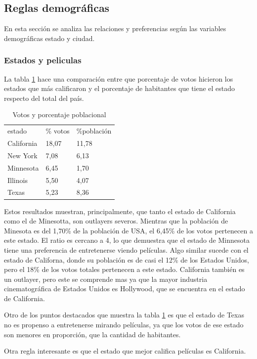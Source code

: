 \documentclass[journal]{IEEEtran}
\begin{document}
\subsection{Reglas demográficas}
En esta sección se analiza las relaciones y preferencias según las variables 
demográficas estado y ciudad. 

\subsubsection{Estados y peliculas}
La tabla \ref{table_state_population} hace una comparación entre que porcentaje
de votos hicieron los estados que más calificaron y el porcentaje de habitantes
que tiene el estado respecto del total del país.

\begin{table}[ht!]
\caption{Votos y porcentaje poblacional}
\label{table_state_population}
\centering
\begin{tabular}{l l l}
estado & \% votos & \%población  \\
California & 18,07 & 11,78 \\
New York & 7,08 & 6,13 \\
Minnesota & 6,45 & 1,70 \\
Illinois & 5,50 & 4,07 \\
Texas & 5,23 & 8,36
\end{tabular}
\end{table}

Estos resultados muestran, principalmente, que tanto el estado de California
como el de Minesotta, son outlayers severos. Mientras que la población de
Minesota es del 1,70\% de la población de USA, el 6,45\% de los votos pertenecen
a este estado. El ratio es cercano a 4, lo que demuestra
que el estado de Minnesota tiene una preferencia de entretenerse viendo películas.
Algo similar sucede con el estado de Californa, donde su población es de casi el
12\% de los Estados Unidos, pero el 18\% de los votos totales pertenecen a este
estado. California también es un outlayer, pero este se comprende mas ya que la
mayor industria cinematográfica de Estados Unidos es Hollywood, que se encuentra
en el estado de California.

Otro de los puntos destacados que muestra la tabla \ref{table_state_population} es
que el estado de Texas no es propenso a entretenerse mirando películas, ya que los
votos de ese estado son menores en proporción, que la cantidad de habitantes.

Otra regla interesante es que el estado que mejor califica películas es California.
\end{document}
